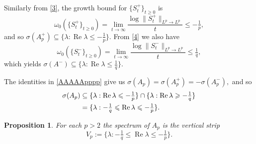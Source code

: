 \documentclass[11pt]{amsart}
\numberwithin{equation}{section}
\theoremstyle{plain}
\newtheorem{Proposition}[equation]{Proposition}
\theoremstyle{definition}
\renewcommand{\leq}{\leqslant}
\renewcommand{\geq}{\geqslant}
\renewcommand{\subset}{\subseteq}
\renewcommand{\Re}[1]{\operatorname{Re} #1 }
\newcommand{\0}{{\color{lightgray}0}}
\begin{document}
Similarly from \eqref{3}, the growth bound for $\{S_t^+\}_{t \geq 0}$ is
$$
\omega_0(\{S_t^+\}_{t \geq 0}) = \lim_{t \to \infty} \frac{\log \|S_t^+\|_{L^p \to L^p}}{t} \leq -\tfrac{1}{p},$$
and so 
$\sigma(A_{p}^+) \subseteq \{ \lambda : \Re \lambda \leq -\tfrac{1}{p} \}.$
From  \eqref{4} we also have
$$
\omega_0(\{S_t^-\}_{t \geq 0}) = \lim_{t \to \infty} \frac{\log \|S_t^-\|_{L^p \to L^p}}{t} \leq \tfrac{1}{q},$$
which yields
$  \sigma(A^-) \subseteq
\{ \lambda : \Re \lambda \leq \tfrac{1}{q} \}.
$

The identities in  \eqref{AAAAApppp} give us 
$
\sigma(A_{p}) = \sigma(A_{p}^+) = -\sigma(A_{p}^-),
$
and so
\begin{align}
\sigma(A_p) & \subset  \{\lambda: \Re \lambda \leq -\tfrac{1}{p}\}\cap\{\lambda: \Re \lambda \geq -\tfrac{1}{q}\}\notag \\
& = \{\lambda: -\tfrac{1}{q}\leq \Re \lambda \leq -\tfrac{1}{p}\}.\label{996T}
\end{align}

\begin{Proposition}
 For each $p > 2$ the spectrum of $A_p$ is the vertical strip 
$$
V_p :=\{\lambda: -\tfrac{1}{q}\leq \Re \lambda \leq -\tfrac{1}{p}\}. $$
\end{Proposition}
\end{document}
